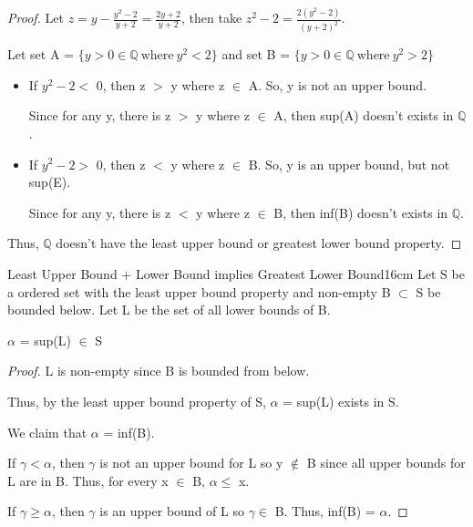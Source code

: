 	\begin{proof}
		Let $ z = y - \frac{y^2-2}{y+2} = \frac{2y+2}{y+2} $,
		then take $ z^2-2 = \frac{2(y^2-2)}{(y+2)^2} $.

		Let set A = $ \{ y > 0 \in \mathbb{Q} \ \text{where} \ y^2 < 2 \} $ and
		set B = $ \{ y > 0 \in \mathbb{Q} \ \text{where} \ y^2 > 2 \} $

		\begin{itemize}[leftmargin=1cm, itemsep=0.1cm]
			\item If $ y^2-2 < $ 0, then z $>$ y where z $\in$ A.
				So, y is not an upper bound.

				Since for any y, there is z $>$ y where z $\in$ A, then
				sup(A) doesn't exists in $\mathbb{Q}$.
		
			\item If $ y^2-2 > $ 0, then z $<$ y where z $\in$ B.
				So, y is an upper bound, but not sup(E).

				Since for any y, there is z $<$ y where z $\in$ B, then
				inf(B) doesn't exists in $\mathbb{Q}$.
		\end{itemize}

		Thus, $\mathbb{Q}$ doesn't have the least upper bound or
		greatest lower bound property.
	\end{proof}

	\vspace{0.5cm}


	
	\begin{wtheorem}{Least Upper Bound + Lower Bound
	implies Greatest Lower Bound}{16cm}
		Let S be a ordered set with the least upper bound property
		and non-empty B $\subset$ S be bounded below.
		Let L be the set of all lower bounds of B.

		\hspace{0.5cm}
		$\alpha$ = sup(L) $\in$ S		
	\end{wtheorem}

	\begin{proof}
		L is non-empty since B is bounded from below.

		Thus, by the least upper bound property of S, $\alpha$ = sup(L) exists in S.

		We claim that $\alpha$ = inf(B).

		If $\gamma < \alpha$, then $\gamma$ is not an upper bound for L
		so y $\not \in$ B since all upper bounds for L are in B.
		Thus, for every x $\in$ B, $\alpha \leq$ x.

		If $\gamma \geq \alpha$, then $\gamma$ is an upper bound of L
		so $\gamma \in$ B.
		Thus, inf(B) = $\alpha$.
	\end{proof}

